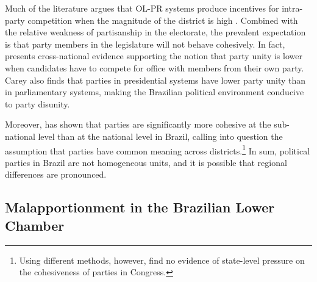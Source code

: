 Much of the literature argues that OL-PR systems produce incentives  for intra-party competition when the magnitude of the district is high  \citep{ames:2001,carey:1995,mainwaring:1999,carey:2007}. Combined with the relative weakness of partisanship in the electorate, the prevalent expectation  is that party members in the legislature will not behave cohesively. In fact,  \cite{carey:2007} presents cross-national evidence supporting the notion that party unity is lower when candidates have to compete for office with members from their own party. Carey also finds that parties in presidential systems  have lower party unity than in parliamentary systems, making the Brazilian political environment conducive to party disunity.    

Moreover, \citet{desposato:2003} has   shown that parties are significantly more cohesive at the sub-national level than at the national level in Brazil, calling into question the assumption that parties have common meaning across districts.\footnote{Using different methods, however, \citet{carey:2004} find no evidence of state-level pressure on the cohesiveness of parties in Congress.} In sum, political parties in Brazil are not homogeneous units, and it is possible that regional differences are pronounced. 


\subsection*{Malapportionment in the Brazilian Lower Chamber}



